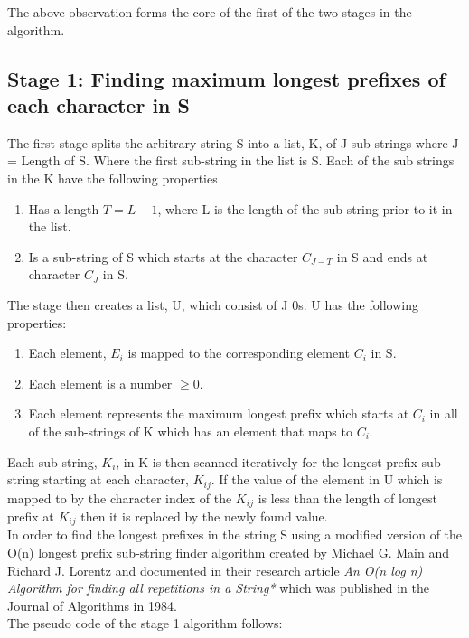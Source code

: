 \documentclass[12pt]{article}
\begin{document}
The above observation forms the core of the first of the two stages in the algorithm.

\subsection{Stage 1: Finding maximum longest prefixes of each character in S}

The first stage splits the arbitrary string S into a list, K, of J sub-strings where J = Length of S. Where the first sub-string in the list is S.
Each of the sub strings in the K have the following properties
\begin{enumerate}
	\item Has a length $T = L - 1$, where L is the length of the sub-string prior to it in the list.
	\item Is a sub-string of S which starts at the character $C_{J - T} $ in S and ends at character $C_{J}$ in S.
\end{enumerate}

The stage then creates a list, U, which consist of J 0s. 
U has the following properties:
\begin{enumerate}
	\item Each element, $E_{i}$ is mapped to the corresponding element $C_{i}$ in S.
	\item Each element is a number $\ge 0$.
	\item Each element represents the maximum longest prefix which starts at $C_{i}$ in all of the sub-strings of K which has an element that maps to $C_{i}$.  
	
\end{enumerate}

Each sub-string, $K_{i}$, in K is then scanned iteratively for the longest prefix sub-string starting at each character, $K_{ij}$. If the value of the element in U which is mapped to by the character index of the $K_{ij}$ is less than the length of longest prefix at $K_{ij}$ then it is replaced by the newly found value. \\
  
In order to find the longest prefixes in the string S using a modified version of the O(n) longest prefix sub-string finder algorithm created by Michael G. Main and Richard J. Lorentz and documented in their research article \textit{An O(n log n) Algorithm for finding all repetitions in a String*} which was published in the Journal of Algorithms in 1984.\\

The pseudo code of the stage 1 algorithm follows:
\end{document}

